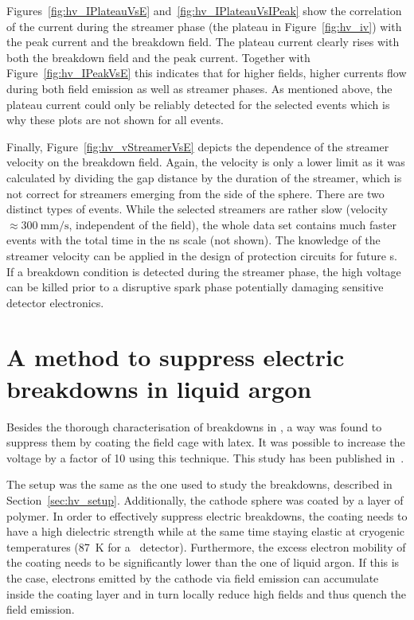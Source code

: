 Figures~\ref{fig:hv_IPlateauVsE} and~\ref{fig:hv_IPlateauVsIPeak} show the correlation of the current during the streamer phase (the plateau in Figure~\ref{fig:hv_iv}) with the peak current and the breakdown field.
The plateau current clearly rises with both the breakdown field and the peak current.
Together with Figure~\ref{fig:hv_IPeakVsE} this indicates that for higher fields, higher currents flow during both field emission as well as streamer phases.
As mentioned above, the plateau current could only be reliably detected for the selected events which is why these plots are not shown for all events.

Finally, Figure~\ref{fig:hv_vStreamerVsE} depicts the dependence of the streamer velocity on the breakdown field.
Again, the velocity is only a lower limit as it was calculated by dividing the gap distance by the duration of the streamer, which is not correct for streamers emerging from the side of the sphere.
There are two distinct types of events.
While the selected streamers are rather slow (velocity $\approx \SI{300}{\milli\metre\per\second}$, independent of the field), the whole data set contains much faster events with the total time in the ns scale (not shown).
The knowledge of the streamer velocity can be applied in the design of protection circuits for future \lartpc s.
If a breakdown condition is detected during the streamer phase, the high voltage can be killed prior to a disruptive spark phase potentially damaging sensitive detector electronics.


\section{A method to suppress electric breakdowns in liquid argon\label{sec:hv_latex}}

Besides the thorough characterisation of breakdowns in \lar, a way was found to suppress them by coating the field cage with latex.
It was possible to increase the voltage by a factor of \num{10} using this technique.
This study has been published in~\cite{latex}.

The setup was the same as the one used to study the breakdowns, described in Section~\ref{sec:hv_setup}.
Additionally, the cathode sphere was coated by a layer of polymer.
In order to effectively suppress electric breakdowns, the coating needs to have a high dielectric strength while at the same time staying elastic at cryogenic temperatures (\SI{87}{\kelvin} for a \lar\ detector).
Furthermore, the excess electron mobility of the coating needs to be significantly lower than the one of liquid argon.
If this is the case, electrons emitted by the cathode via field emission can accumulate inside the coating layer and in turn locally reduce high fields and thus quench the field emission.


